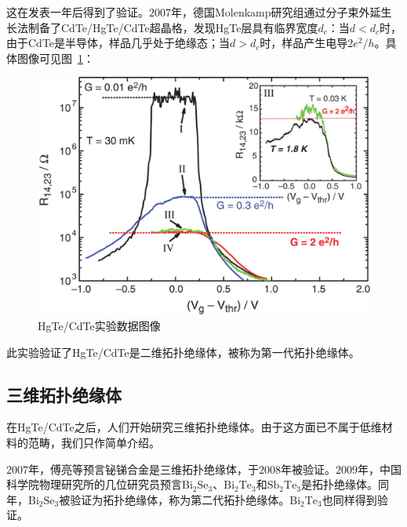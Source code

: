 这在\cite{RN34}发表一年后得到了验证。$2007$年，德国Molenkamp研究组通过分子束外延生长法制备了CdTe/HgTe/CdTe超晶格，发现HgTe层具有临界宽度$d_c$：当$d<d_c$时，由于CdTe是半导体，样品几乎处于绝缘态；当$d>d_c$时，样品产生电导$2e^2/h$\cite{RN35}。具体图像可见图~\ref{fig:hgte}：

\begin{figure}
    \centering
    \includegraphics[scale=0.4]{img/HgTe+CdTe}
    \caption{HgTe/CdTe实验数据图像}
    \label{fig:hgte}
\end{figure}

此实验验证了HgTe/CdTe是二维拓扑绝缘体，被称为第一代拓扑绝缘体。

\subsection{三维拓扑绝缘体}

在HgTe/CdTe之后，人们开始研究三维拓扑绝缘体。由于这方面已不属于低维材料的范畴，我们只作简单介绍。

$2007$年，傅亮等预言铋锑合金是三维拓扑绝缘体\cite{RN36}，于$2008$年被验证\cite{RN37}。$2009$年，中国科学院物理研究所的几位研究员预言$\mathrm{Bi}_2\mathrm{Se}_3$、$\mathrm{Bi}_2\mathrm{Te}_3$和$\mathrm{Sb}_2\mathrm{Te}_3$是拓扑绝缘体\cite{RN38}。同年，$\mathrm{Bi}_2\mathrm{Se}_3$被验证为拓扑绝缘体\cite{RN39}，称为第二代拓扑绝缘体。$\mathrm{Bi}_2\mathrm{Te}_3$也同样得到验证\cite{RN40}。